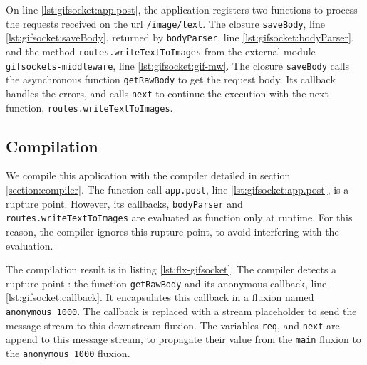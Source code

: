 On line \ref{lst:gifsocket:app.post}, the application registers two functions to process the requests received on the url \texttt{/image/text}.
The closure \texttt{saveBody}, line \ref{lst:gifsocket:saveBody}, returned by \texttt{bodyParser}, line \ref{lst:gifsocket:bodyParser}, and the method \texttt{routes.write\-Text\-To\-Images} from the external module \texttt{gifsockets-middleware}, line \ref{lst:gifsocket:gif-mw}.
The closure \texttt{saveBody} calls the asynchronous function \texttt{getRawBody} to get the request body.
Its callback handles the errors, and calls \texttt{next} to continue the execution with the next function, \texttt{routes.write\-Text\-To\-Images}.



\subsection{Compilation}

We compile this application with the compiler detailed in section \ref{section:compiler}.
The function call \texttt{app.post}, line \ref{lst:gifsocket:app.post}, is a rupture point.
However, its callbacks, \texttt{bodyParser} and \texttt{routes.write\-Text\-To\-Images} are evaluated as function only at runtime.
For this reason, the compiler ignores this rupture point, to avoid interfering with the evaluation.

The compilation result is in listing \ref{lst:flx-gifsocket}.
The compiler detects a rupture point : the function \texttt{getRawBody} and its anonymous callback, line \ref{lst:gifsocket:callback}.
It encapsulates this callback in a fluxion named \texttt{anonymous\-\_1000}.
The callback is replaced with a stream placeholder to send the message stream to this downstream fluxion.
The variables \texttt{req}, and \texttt{next} are append to this message stream, to propagate their value from the \texttt{main} fluxion to the \texttt{anonymous\-\_1000} fluxion.

